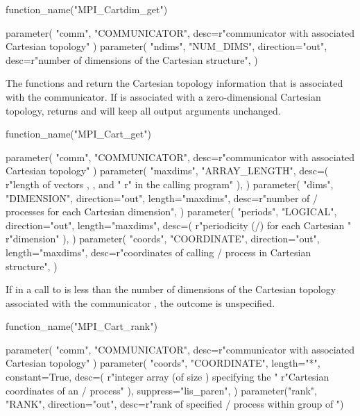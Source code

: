 \begin{mpi-binding}
    function_name("MPI_Cartdim_get")
    
    parameter(
        "comm", "COMMUNICATOR", desc=r"communicator with associated Cartesian topology"
    )
    parameter(
        "ndims",
        "NUM_DIMS",
        direction="out",
        desc=r"number of dimensions of the Cartesian structure",
    )
\end{mpi-binding}

The functions  and
 return the Cartesian topology information that is
associated with the communicator.
If  is associated with a zero-dimensional Cartesian topology,
 returns  and  will keep
all output arguments unchanged. 

\begin{mpi-binding}
    function_name("MPI_Cart_get")
    
    parameter(
        "comm", "COMMUNICATOR", desc=r"communicator with associated Cartesian topology"
    )
    parameter(
        "maxdims",
        "ARRAY_LENGTH",
        desc=(
            r"length of vectors , , and "
            r" in the calling program"
        ),
    )
    parameter(
        "dims",
        "DIMENSION",
        direction="out",
        length="maxdims",
        desc=r"number of \MPI/ processes for each Cartesian dimension",
    )
    parameter(
        "periods",
        "LOGICAL",
        direction="out",
        length="maxdims",
        desc=(
            r"periodicity (/) for each Cartesian "
            r"dimension"
        ),
    )
    parameter(
        "coords",
        "COORDINATE",
        direction="out",
        length="maxdims",
        desc=r"coordinates of calling \MPI/ process in Cartesian structure",
    )
\end{mpi-binding}
If  in a call to  is less than the number of dimensions of the Cartesian topology associated with the communicator , the outcome is unspecified.

\begin{mpi-binding}
    function_name("MPI_Cart_rank")
    
    parameter(
        "comm", "COMMUNICATOR", desc=r"communicator with associated Cartesian topology"
    )
    parameter(
        "coords",
        "COORDINATE",
        length="*",
        constant=True,
        desc=(
            r"integer array (of size ) specifying the "
            r"Cartesian coordinates of an \MPI/ process"
        ),
        suppress="lis_paren",
    )
    parameter("rank", "RANK", direction="out", desc=r"rank of specified \MPI/ process within group of ")
\end{mpi-binding}

